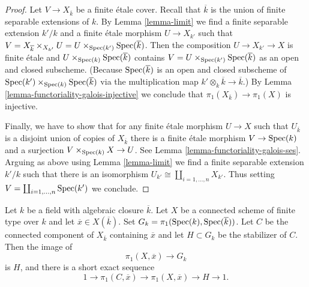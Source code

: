 \begin{proof}
\medskip\noindent
Let $V \to X_{\overline{k}}$ be a finite \'etale cover. Recall that
$\overline{k}$ is the union of finite separable extensions of $k$.
By Lemma \ref{lemma-limit} we find a finite separable extension $k'/k$
and a finite \'etale morphism $U \to X_{k'}$ such that
$V = X_{\overline{k}} \times_{X_{k'}} U =
U \times_{\mathop{\mathrm{Spec}}(k')} \mathop{\mathrm{Spec}}(\overline{k})$.
Then the composition $U \to X_{k'} \to X$ is finite \'etale
and $U \times_{\mathop{\mathrm{Spec}}(k)} \mathop{\mathrm{Spec}}(\overline{k})$
contains $V = U \times_{\mathop{\mathrm{Spec}}(k')} \mathop{\mathrm{Spec}}(\overline{k})$
as an open and closed subscheme. (Because $\mathop{\mathrm{Spec}}(\overline{k})$
is an open and closed subscheme of
$\mathop{\mathrm{Spec}}(k') \times_{\mathop{\mathrm{Spec}}(k)} \mathop{\mathrm{Spec}}(\overline{k})$ via
the multiplication map $k' \otimes_k \overline{k} \to \overline{k}$.) By
Lemma \ref{lemma-functoriality-galois-injective}
we conclude that $\pi_1(X_{\overline{k}}) \to \pi_1(X)$ is injective.

\medskip\noindent
Finally, we have to show that for any finite \'etale morphism
$U \to X$ such that $U_{\overline{k}}$ is a disjoint union
of copies of $X_{\overline{k}}$ there is a finite \'etale
morphism $V \to \mathop{\mathrm{Spec}}(k)$ and a surjection $V \times_{\mathop{\mathrm{Spec}}(k)} X \to U$.
See Lemma \ref{lemma-functoriality-galois-ses}.
Arguing as above using Lemma \ref{lemma-limit}
we find a finite separable extension $k'/k$
such that there is an isomorphism
$U_{k'} \cong \coprod_{i = 1, \ldots, n} X_{k'}$.
Thus setting $V = \coprod_{i = 1, \ldots, n} \mathop{\mathrm{Spec}}(k')$
we conclude.
\end{proof}






\begin{lemma}
\label{lemma-ses-field-component}
Let $k$ be a field with algebraic closure $\overline{k}$.
Let $X$ be a connected scheme of finite type over $k$ and let
$\overline{x} \in X(\overline{k})$.
Set $G_k = \pi_1(\mathop{\mathrm{Spec}}(k), \mathop{\mathrm{Spec}}(\overline{k}))$.
Let $C$ be the connected component of $X_{\overline{k}}$ containing
$\overline{x}$ and let $H \subset G_k$ be the stabilizer of $C$. Then the
image of
$$
\pi_1(X, \overline{x}) \longrightarrow G_k
$$
is $H$, and there is a short exact sequence
$$
1 \longrightarrow \pi_1(C, \overline{x}) \longrightarrow
\pi_1(X, \overline{x}) \longrightarrow H \longrightarrow 1.
$$
\end{lemma}

